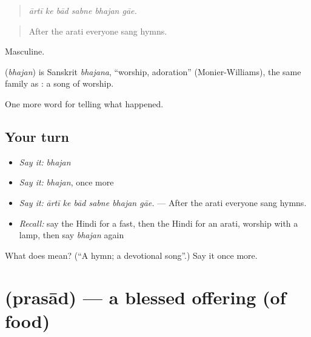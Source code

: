 \begin{quote}
     
\end{quote}

\begin{quote}
\emph{ārtī ke bād sabne bhajan gāe.}
\end{quote}

\begin{quote}
After the arati everyone sang hymns.
\end{quote}

Masculine.

\begin{cousinweb}
\textbf{} (\emph{bhajan}) is Sanskrit \emph{bhajana}, \textquotedblleft{}worship, adoration\textquotedblright{} (Monier-Williams), the same family as \textbf{}: a song of worship.
\end{cousinweb}

\begin{grammarlens}[title={What you've built}]
One more word for telling what happened.
\end{grammarlens}

\subsection*{Your turn}
\begin{itemize}
\raggedright
  \item \emph{Say it:} \emph{bhajan}
  \item \emph{Say it:} \emph{bhajan}, once more
  \item \emph{Say it:} \emph{ārtī ke bād sabne bhajan gāe.} — After the arati everyone sang hymns.
  \item \emph{Recall:} say the Hindi for a fast, then the Hindi for an arati, worship with a lamp, then say \emph{bhajan} again
\end{itemize}

\begin{tcolorbox}[breakable,colback=teal!4,colframe=teal!35!black,title={Before you move on}]
What does  mean? (\textquotedblleft{}A hymn; a devotional song\textquotedblright{}.) Say it once more.
\end{tcolorbox}
\section[\texorpdfstring{\hi{प्रसाद} (prasād)}{प्रसाद (prasād)}]{ (prasād) — a blessed offering (of food)}

